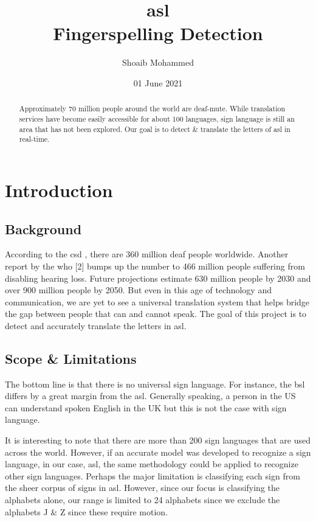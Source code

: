 \documentclass[twocolumn]{article}
\title{\gls{asl}\\
	Fingerspelling Detection}
\author{Shoaib Mohammed}
\date{01 June 2021}
\begin{document}
\begin{titlepage}
\maketitle
\thispagestyle{empty}
\end{titlepage}

\begin{abstract}
Approximately 70 million people around the world are deaf-mute. While 
translation services have become easily accessible for about 100 
languages, sign language is still an area that has not been explored. 
Our goal is to detect \& translate the letters of \gls{asl} in real-time.
\end{abstract}

\section{Introduction}

\subsection{Background}
According to the \gls{csd} \cite{csd}, there are 360 million deaf people 
worldwide. Another report by the \gls{who} [2] bumps up the number to 466 
million people suffering from disabling hearing loss. Future projections 
estimate 630 million people by 2030 and over 900 million people by 2050. 
But even in this age of technology and communication, we are yet to see a 
universal translation system that helps bridge the gap between people that 
can and cannot speak. The goal of this project is to detect and accurately 
translate the letters in \gls{asl}.

\subsection{Scope \& Limitations}
The bottom line is that there is no universal sign language. For instance, the 
\gls{bsl} differs by a great margin from the \gls{asl}. Generally speaking, a 
person in the US can understand spoken English in the UK but this is not the 
case with sign language.

It is interesting to note that there are more than 200 sign languages that are 
used across the world. However, if an accurate model was developed to 
recognize a sign language, in our case, \gls{asl}, the same methodology could be 
applied to recognize other sign languages. Perhaps the major limitation is 
classifying each sign from the sheer corpus of signs in \gls{asl}.
However, since our focus is classifying the alphabets alone, our range is 
limited to 24 alphabets since we exclude the alphabets J \& Z since these 
require motion.
\end{document}
